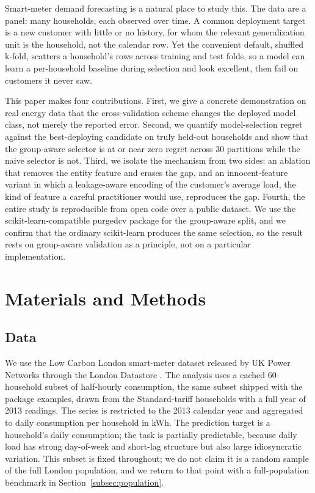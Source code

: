 \documentclass[10pt]{article}
\newcommand{\pcv}{\textsf{purgedcv}}
\newcommand{\pkg}[1]{\textsf{#1}}
\DeclareRobustCommand{\code}[1]{\texttt{\detokenize{#1}}}
\begin{document}
Smart-meter demand forecasting is a natural place to study this. The data are a
panel: many households, each observed over time. A common deployment target is a
new customer with little or no history, for whom the relevant generalization
unit is the household, not the calendar row. Yet the convenient default,
shuffled k-fold, scatters a household's rows across training and test folds, so
a model can learn a per-household baseline during selection and look excellent,
then fail on customers it never saw.

This paper makes four contributions. First, we give a concrete demonstration on
real energy data that the cross-validation scheme changes the deployed model
class, not merely the reported error. Second, we quantify model-selection regret
against the best-deploying candidate on truly held-out households and show that
the group-aware selector is at or near zero regret across 30 partitions while the
naive selector is not. Third, we isolate the mechanism from two
sides: an ablation that removes the entity feature and erases the gap, and an
innocent-feature variant in which a leakage-aware encoding of the customer's
average load, the kind of feature a careful practitioner would use, reproduces
the gap. Fourth,
the entire study is reproducible from open code over a public dataset. We use the
\pkg{scikit-learn}-compatible \pcv{} package
\citep{purgedcv2026,pedregosa2011sklearn} for the group-aware split, and we
confirm that the ordinary \pkg{scikit-learn} \code{GroupKFold} produces the same
selection, so the result rests on group-aware validation as a principle, not on a
particular implementation.

\section{Materials and Methods}

\subsection{Data}

We use the Low Carbon London smart-meter dataset released by UK Power Networks
through the London Datastore \citep{ukpn_lcl}. The analysis uses a cached
60-household subset of half-hourly consumption, the same subset shipped with the
package examples, drawn from the Standard-tariff households with a full year of
2013 readings. The series is restricted to the 2013 calendar year and aggregated
to daily consumption per household in kWh. The prediction target is a household's
daily consumption; the task is partially predictable, because daily load has
strong day-of-week and short-lag structure but also large idiosyncratic
variation. This subset is fixed throughout; we do not claim it is a random sample
of the full London population, and we return to that point with a
full-population benchmark in Section~\ref{subsec:population}.
\end{document}
